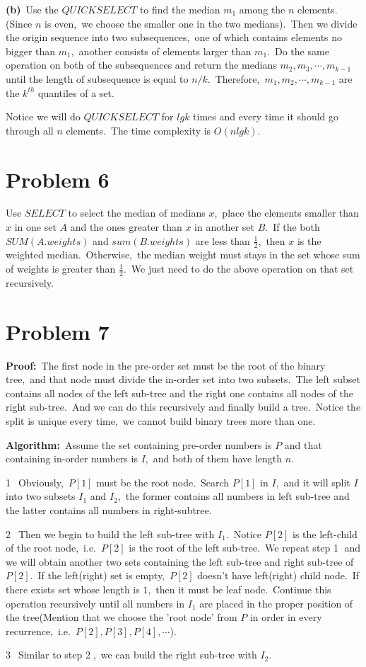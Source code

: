 \documentclass[]{article}
\begin{document}
	\textbf{(b)}\ Use the $QUICKSELECT$ to find the median $m_1$ among the $n$ elements.(Since $n$ is even,\ we choose the smaller one in the two medians).\ Then we divide the origin sequence into two subsequences,\ one of which contains elements no bigger than $m_1$,\ another consists of elements larger than $m_1$.\ Do the same operation on both of the subsequences and return the medians $m_2,m_3,\cdots,m_{k-1}$ until the length of subsequence is equal to $n/k$.\ Therefore,\ $m_1,m_2,\cdots,m_{k-1}$ are the $k^{th}$ quantiles of a set.
	
	Notice we will do $QUICKSELECT$ for $lgk$ times and every time it should go through all $n$ elements.\ The time complexity is $O(nlgk)$.  
	
	\section{Problem 6}
	Use $SELECT$ to select the median of medians $x$,\ place the elements smaller than $x$ in one set $A$ and the ones greater than $x$ in another set $B$.\ If the both $SUM(A.weights)$ and $sum(B.weights)$ are less than $\frac{1}{2}$,\ then $x$ is the weighted median.\ Otherwise,\ the median weight must stays in the set whose sum of weights is greater than $\frac{1}{2}$.\ We just need to do the above operation on that set recursively.
	
	\section{Problem 7}
	\textbf{Proof:}\ The first node in the pre-order set must be the root of the binary tree,\ and that node must divide the in-order set into two subsets.\ The left subset contains all nodes of the left sub-tree and the right one contains all nodes of the right sub-tree.\ And we can do this recursively and finally build a tree.\ Notice the split is unique every time,\ we cannot build binary trees more than one.
	
	\textbf{Algorithm:}\ Assume the set containing pre-order numbers is $P$ and that containing in-order numbers is $I$,\ and both of them have length $n$.
	
	\textcircled{1}\ Obviously,\ $P[1]$ must be the root node.\ Search $P[1]$ in $I$,\ and it will split $I$ into two subsets $I_1$ and $I_2$,\ the former contains all numbers in left sub-tree and the latter contains all numbers in right-subtree.
	
	\textcircled{2}\ Then we begin to build the left sub-tree with $I_1$.\ Notice $P[2]$ is the left-child of the root node,\ i.e.\ $P[2]$ is the root of the left sub-tree.\ We repeat step \textcircled{1} and we will obtain another two sets containing the left sub-tree and right sub-tree of $P[2]$.\ If the left(right) set is empty,\ $P[2]$ doesn't have left(right) child node.\ If there exists set whose length is $1$,\ then it must be leaf node.\ Continue this operation recursively until all numbers in $I_1$ are placed in the proper position of the tree(Mention that we choose the 'root node' from $P$ in order in every recurrence,\ i.e.\ $P[2],P[3],P[4],\cdots$).
	
	\textcircled{3}\ Similar to step \textcircled{2},\ we can build the right sub-tree with $I_2$.
	     
\end{document}
